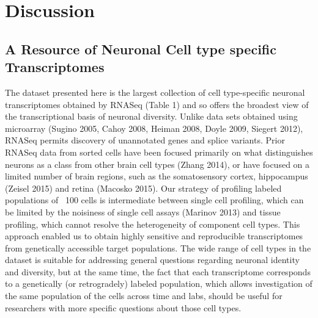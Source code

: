 
\section{Discussion}

\subsection{A Resource of Neuronal Cell type specific Transcriptomes}
The dataset presented here is the largest collection of cell type-specific neuronal transcriptomes obtained by RNASeq (Table 1) and so offers the broadest view of the transcriptional basis of neuronal diversity. Unlike data sets obtained using microarray (Sugino 2005, Cahoy 2008, Heiman 2008, Doyle 2009, Siegert 2012), RNASeq permits discovery of unannotated genes and splice variants. Prior RNASeq data from sorted cells have been focused primarily on what distinguishes neurons as a class from other brain cell types (Zhang 2014), or have focused on a limited number of brain regions, such as the somatosensory cortex, hippocampus (Zeisel 2015) and retina (Macosko 2015). Our strategy of profiling labeled populations of ~100 cells is intermediate between single cell profiling, which can be limited by the noisiness of single cell assays (Marinov 2013) and tissue profiling, which cannot resolve the heterogeneity of component cell types. This approach enabled us to obtain highly sensitive and reproducible transcriptomes from genetically accessible target populations. The wide range of cell types in the dataset is suitable for addressing general questions regarding neuronal identity and diversity, but at the same time, the fact that each transcriptome corresponds to a genetically (or retrogradely) labeled population, which allows investigation of the same population of the cells across time and labs, should be useful for researchers with more specific questions about those cell types.

